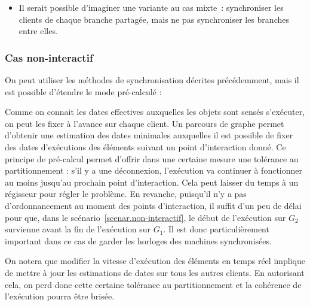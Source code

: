 \documentclass{article}
\newcommand\trigger{point d'interaction\xspace}
\begin{document}
\begin{itemize}
    \begin{figure}[h]
        \centering
        \begin{tikzpicture}
        
        \end{tikzpicture}
        \label{scenar.twobranches}
    \end{figure}

    \item Il serait possible d'imaginer une variante au cas mixte~: synchroniser les clients de chaque branche partagée, mais ne pas synchroniser les branches entre elles.
    
\end{itemize}



\subsubsection{Cas non-interactif}
On peut utiliser les méthodes de synchronisation décrites précédemment, mais il est possible d'étendre le mode pré-calculé : 

Comme on connait les dates effectives auxquelles les objets sont sensés s'exécuter, on peut les fixer à l'avance sur chaque client. 
Un parcours de graphe permet d'obtenir une estimation des dates minimales auxquelles il est possible de fixer des dates d'exécutions des éléments suivant un point d'interaction donné.
Ce principe de pré-calcul permet d'offrir dans une certaine mesure une tolérance au partitionnement :  s'il y a une déconnexion, l'exécution va continuer à fonctionner au moins jusqu'au prochain \trigger. 
Cela peut laisser du temps à un régisseur pour régler le problème.
En revanche, puisqu'il n'y a pas d'ordonnancement au moment des points d'interaction, il suffit d'un peu de délai pour que, dans le scénario~\ref{scenar.non-interactif}, le début de l'exécution sur $G_2$ survienne avant la fin de l'exécution sur $G_1$. 
Il est donc particulièrement important dans ce cas de garder les horloges des machines synchronisées.

On notera que modifier la vitesse d'exécution des éléments en temps réel implique de mettre à jour les estimations de dates sur tous les autres clients. 
En autorisant cela, on perd donc cette certaine tolérance au partitionnement et la cohérence de l'exécution pourra être brisée.
\end{document}
